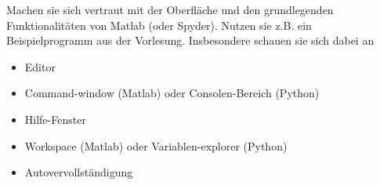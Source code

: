 \begin{aufg}[0]
Machen sie sich vertraut mit der Oberfläche und den grundlegenden Funktionalitäten von Matlab (oder Spyder). Nutzen sie z.B.
ein Beispielprogramm aus der Vorlesung. Insbesondere schauen sie sich dabei an
\begin{itemize}
  \item Editor
  \item Command-window (Matlab) oder  Consolen-Bereich (Python)
  \item Hilfe-Fenster
  \item Workspace (Matlab) oder Variablen-explorer (Python) 
  \item Autovervollständigung
\end{itemize}
\end{aufg}

